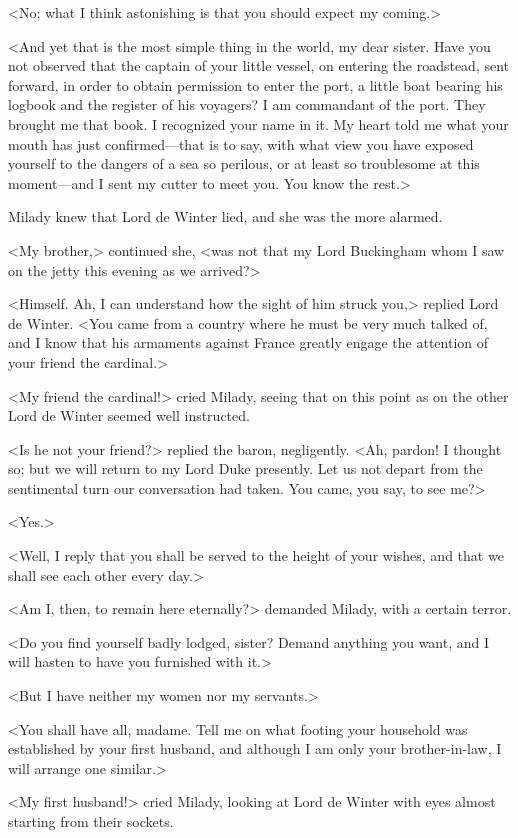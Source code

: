 <No; what I think astonishing is that you should expect my coming.> 

<And yet that is the most simple thing in the world, my dear sister. Have you not observed that the captain of your little vessel, on entering the roadstead, sent forward, in order to obtain permission to enter the port, a little boat bearing his logbook and the register of his voyagers? I am commandant of the port. They brought me that book. I recognized your name in it. My heart told me what your mouth has just confirmed---that is to say, with what view you have exposed yourself to the dangers of a sea so perilous, or at least so troublesome at this moment---and I sent my cutter to meet you. You know the rest.> 

Milady knew that Lord de Winter lied, and she was the more alarmed. 

<My brother,> continued she, <was not that my Lord Buckingham whom I saw on the jetty this evening as we arrived?> 

<Himself. Ah, I can understand how the sight of him struck you,> replied Lord de Winter. <You came from a country where he must be very much talked of, and I know that his armaments against France greatly engage the attention of your friend the cardinal.> 

<My friend the cardinal!> cried Milady, seeing that on this point as on the other Lord de Winter seemed well instructed. 

<Is he not your friend?> replied the baron, negligently. <Ah, pardon! I thought so; but we will return to my Lord Duke presently. Let us not depart from the sentimental turn our conversation had taken. You came, you say, to see me?> 

<Yes.> 

<Well, I reply that you shall be served to the height of your wishes, and that we shall see each other every day.> 

<Am I, then, to remain here eternally?> demanded Milady, with a certain terror. 

<Do you find yourself badly lodged, sister? Demand anything you want, and I will hasten to have you furnished with it.> 

<But I have neither my women nor my servants.> 

<You shall have all, madame. Tell me on what footing your household was established by your first husband, and although I am only your brother-in-law, I will arrange one similar.> 

<My first husband!> cried Milady, looking at Lord de Winter with eyes almost starting from their sockets. 

